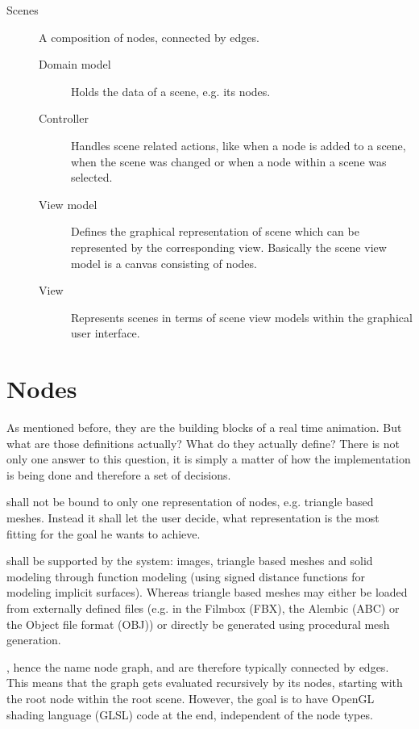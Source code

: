 \documentclass[%
    a4paper,    %
    justified,  %
    nobib,      %
    openany     %
]{tufte-book}
\begin{document}
\begin{description}
\item[Scenes] A composition of nodes, connected by edges.
  \begin{description}
    \item[Domain model] Holds the data of a scene, e.g. its nodes.
    \item[Controller]   Handles scene related actions, like when a node is added
                        to a scene, when the scene was changed or when a node
                        within a scene was selected.
    \item[View model]   Defines the graphical representation of scene which can
                        be represented by the corresponding view. Basically the
                        scene view model is a canvas consisting of nodes.
    \item[View]         Represents scenes in terms of scene view models within the
                        graphical user interface.
  \end{description}
\end{description}

\section{Nodes}
\label{appendix:sec:node-grahp:nodes}

 As mentioned before, they are
the building blocks of a real time animation. But what are those definitions
actually? What do they actually define? There is not only one answer to this
question, it is simply a matter of how the implementation is being done and
therefore a set of decisions.

 shall not be bound to only one
representation of nodes, e.g. triangle based meshes. Instead it shall let the
user decide, what representation is the most fitting for the goal he wants to
achieve.

 shall be supported by the
system: images, triangle based meshes and solid modeling through function
modeling (using signed distance functions for modeling implicit surfaces).
Whereas triangle based meshes may either be loaded from externally defined files
(e.g. in the Filmbox (FBX), the Alembic (ABC) or the Object file format (OBJ))
or directly be generated using procedural mesh generation.

, hence the name node graph, and
are therefore typically connected by edges. This means that the graph gets
evaluated recursively by its nodes, starting with the root node within the root
scene. However, the goal is to have OpenGL shading language (GLSL) code at the
end, independent of the node types.
\end{document}
